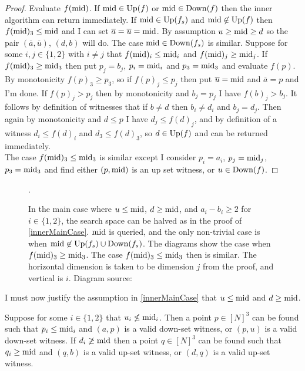 \begin{proof} 
  Evaluate $f(\mathrm{mid})$. If $\mathrm{mid} \in \mathrm{Up}(f)$ or
  $\mathrm{mid} \in \mathrm{Down}(f)$ then the inner algorithm can return immediately. If $\mathrm{mid} \in \mathrm{Up}(f_s)$ and $\mathrm{mid} \not\in \mathrm{Up}(f)$
  then $f(\mathrm{mid})_3 \leq \mathrm{mid}$ and I can set
  $\overline{a} = \overline{u} = \mathrm{mid}$. By assumption $u \geq \mathrm{mid} \geq d$ so the pair $(\overline{a}, \overline{u})$, $(d, b)$ will do.
  The case $\mathrm{mid} \in \mathrm{Down}(f_s)$ is similar.
  Suppose for some $i, j \in \{1, 2\}$ with $i \neq j$ that $f(\mathrm{mid})_i \leq \mathrm{mid}_i$ and $f(\mathrm{mid})_j \geq \mathrm{mid}_j$.
  If $f(\mathrm{mid})_3 \geq \mathrm{mid}_3$ then put $p_j = b_j$, $p_i = \mathrm{mid}_i$ and $p_3 = \mathrm{mid}_3$ and evaluate $f(p)$.  
  By monotonicity $f(p)_3 \geq p_3$, so if $f(p)_j \leq p_j$ then put $\overline{u} = \mathrm{mid}$ and $\overline{a} = p$ and I'm done.
  If $f(p)_j > p_j$ then by monotonicity and $b_j = p_j$ I have $f(b)_j > b_j$. It follows by definition of witnesses that if $b \neq d$ then 
  $b_i \neq d_i$ and $b_j = d_j$. Then again by monotonicity and $d \leq p$ I have $d_j \leq f(d)_j$, and by definition
  of a witness $d_i \leq f(d)_i$ and $d_3 \leq f(d)_3$, so $d \in \mathrm{Up}(f)$ and can be returned immediately. \\
  The case $f(\mathrm{mid})_3 \leq \mathrm{mid}_3$ is similar except I consider $p_i = a_i$, $p_j = \mathrm{mid}_j$, $p_3 = \mathrm{mid}_3$ and
  find either $(p, \mathrm{mid})$ is an up set witness, or $u \in \mathrm{Down}(f)$.
\end{proof}
\vspace{-10pt}
\begin{figure}[ht]
  \centering
  \scalebox{0.4}{}
  \caption{In the main case where $u \leq \mathrm{mid}$, $d \geq \mathrm{mid}$, and $a_i - b_i \geq 2$ for $i \in \{ 1, 2\}$,
  the search space can be halved as in the proof of \cref{innerMainCase}. $\mathrm{mid}$ is queried, and the only non-trivial
  case is when $\mathrm{mid} \not\in \mathrm{Up}(f_s) \cup \mathrm{Down}(f_s)$. The diagrams show the case when $f(\mathrm{mid})_3 \geq \mathrm{mid}_3$.
  The case $f(\mathrm{mid})_3 \leq \mathrm{mid}_3$ then is similar. The horizontal dimension is taken to be dimension $j$ from the proof,
  and vertical is $i$. Diagram source: \citep{fasterTarski}}.
\end{figure}
\vspace{-10pt}
I must now justify the assumption in \cref{innerMainCase} that 
$u \leq \mathrm{mid}$ and $d \geq \mathrm{mid}$.
\begin{lemma}\label{innerOtherCase}
  Suppose for some $i \in \{1, 2\}$ that $u_i \not\leq \mathrm{mid}_i$.
  Then a point $p \in [N]^3$ can be found such that $p_i \leq \mathrm{mid}_i$ and $(a, p)$ is a valid down-set
  witness, or $(p, u)$ is a valid down-set witness. 
  If $d_i \not\geq \mathrm{mid}$ then a point $q \in [N]^3$ can be found such that $q_i \geq \mathrm{mid}$
  and $(q, b)$ is a valid up-set
  witness, or $(d, q)$ is a valid up-set witness. 
\end{lemma}
